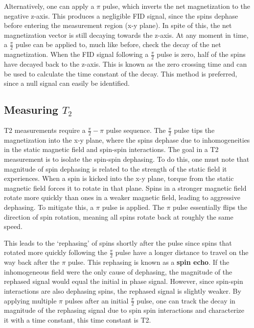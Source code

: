 \documentclass[
    floatfix,  %
    reprint,
    amsmath,amssymb,
    aps,
]{revtex4-2}
\newcommand{\halfpi}{\frac{\pi}{2}}
\begin{document}
Alternatively, one can apply a $\pi$ pulse, which inverts the net magnetization to the negative z-axis. This produces a negligible FID signal, since the spins dephase before entering the measurement region (x-y plane). In spite of this, the net magnetization vector is still decaying towards the z-axis. At any moment in time, a $\halfpi$ pulse can be applied to, much like before, check the decay of the net magnetization. When the FID signal following a $\halfpi$ pulse is zero, half of the spins have decayed back to the z-axis. This is known as the zero crossing time and can be used to calculate the time constant of the decay. This method is preferred, since a null signal can easily be identified.


\subsection{Measuring $T_2$\label{sec:measure-t2}}

T2 measurements require a $\halfpi-\pi$ pulse sequence. The $\halfpi$ pulse tips the magnetization into the x-y plane, where the spins dephase due to inhomogeneities in the static magnetic field and spin-spin interactions. The goal in a T2 measurement is to isolate the spin-spin dephasing.  To do this, one must note that magnitude of spin dephasing is related to the strength of the static field it experiences. When a spin is kicked into the x-y plane, torque from the static magnetic field forces it to rotate in that plane. Spins in a stronger magnetic field rotate more quickly than ones in a weaker magnetic field, leading to aggressive dephasing. To mitigate this, a $\pi$ pulse is applied. The $\pi$ pulse essentially flips the direction of spin rotation, meaning all spins rotate back at roughly the same speed.

This leads to the `rephasing' of spins shortly after the pulse since spins that rotated more quickly following the $\halfpi$ pulse have a longer distance to travel on the way back after the $\pi$ pulse. This rephasing is known as a \textbf{spin echo}. If the inhomogeneous field were the only cause of dephasing, the magnitude of the rephased signal would equal the initial in phase signal. However, since spin-spin interactions are also dephasing spins, the rephased signal is slightly weaker. By applying multiple $\pi$ pulses after an initial $\halfpi$ pulse, one can track the decay in magnitude of the rephasing signal due to spin spin interactions and characterize it with a time constant, this time constant is T2.
\end{document}
